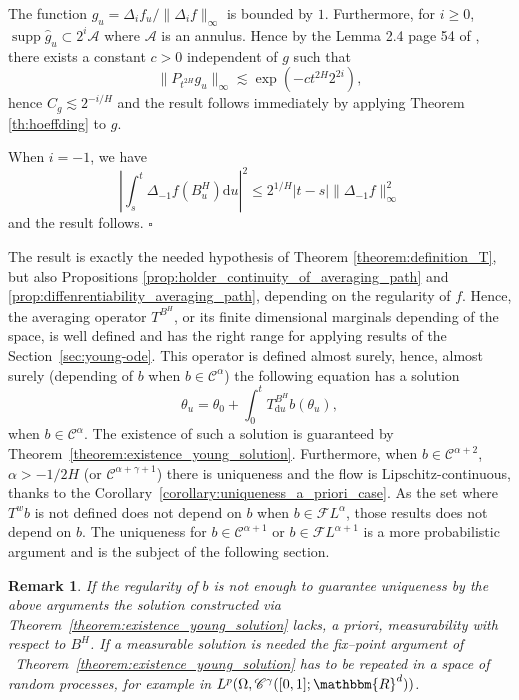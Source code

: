 \documentclass[a4paper,11pt]{article}
\newcommand{\mathd}{\mathrm{d}}
\newcommand{\tmop}[1]{\ensuremath{\operatorname{#1}}}
\newtheorem{remark}[theorem]{Remark}
\newenvironment{proof}{{\sc Proof.}}{\hfill$\square$}
\newcommand{\CC}{\mathscr C}
\newcommand{\CF}{\mathscr F}
\begin{document}
\begin{proof}
  The function $g_{u} = \Delta_{i} f_{u} / \| \Delta_{i} f \|_{\infty}$ is
  bounded by $1$. Furthermore, for $i \geqslant 0$, $\tmop{supp}   \hat{g}_{u}
  \subset 2^{i} \mathcal{A}$ where $\mathcal{A}$ is an annulus. Hence by the
  Lemma 2.4 page 54 of {\cite{bahouri_fourier_2011}}, there exists a constant
  $c>0$ independent of $g$ such that
  \[ \| P_{t^{2H}} g_{u} \|_{\infty} \lesssim \exp ( -c t^{2H} 2^{2i} ), \]
  hence $C_{g} \lesssim 2^{-i/H}$ and the result follows immediately by
  applying Theorem \ref{th:hoeffding} to $g$.
  
  When $i=-1$, we have
  \[ \left\lvert \int_{s}^{t} \Delta_{-1} f ( B^{H}_{u} ) \mathd u \right\lvert^{2}
     \leqslant 2^{1/H} | t-s | \| \Delta_{-1} f \|_{\infty}  ^{2} \]
  and the result follows.
\end{proof}

The result is exactly the needed hypothesis of Theorem
\ref{theorem:definition_T}, but also Propositions
\ref{prop:holder_continuity_of_averaging_path} and
\ref{prop:diffenrentiability_averaging_path}, depending on the regularity of
$f$. Hence, the averaging operator $T^{B^{H}}$, or its finite dimensional
marginals depending of the space, is well defined and has the right range for
applying results of the Section~\ref{sec:young-ode}. This operator is
defined almost surely, hence, almost surely (depending of $b$ when $b \in
\CC^{\alpha}$) the following equation has a solution
\[ \theta_{u} = \theta_{0} + \int_{0}^{t} T^{B^H}_{\mathd u} b ( \theta_{u} ), \]
when $b \in \CC^{\alpha}$. The existence of such a solution is guaranteed by Theorem~\ref{theorem:existence_young_solution}. Furthermore, when $b \in \CC^{\alpha +2}$,
$\alpha >-1/2H$ (or $\CC^{\alpha + \gamma +1}$) there is uniqueness and the
flow is Lipschitz-continuous, thanks to the
Corollary~\ref{corollary:uniqueness_a_priori_case}. As the set where $T^{w} b$
is not defined does not depend on $b$ when $b \in \CF L^{\alpha}$, those
results does not depend on $b$. The uniqueness for $b \in \CC^{\alpha +1}$ or
$b \in \CF L^{\alpha +1}$ is a more probabilistic argument and is the subject
of the following section.

\begin{remark}
  If the regularity of $b$ is not enough to guarantee uniqueness by the above
  arguments the solution constructed via
  Theorem~\ref{theorem:existence_young_solution} lacks, a priori,
  measurability with respect to $B^H$. If a measurable solution is needed the
  fix--point argument of \ Theorem~\ref{theorem:existence_young_solution} has
  to be repeated in a space of random processes, for example in $L^{p} (
  \Omega ,\CC^{\gamma} ( [ 0,1 ] ;\mathbbm{R}^{d} ) )$.
\end{remark}
\end{document}
